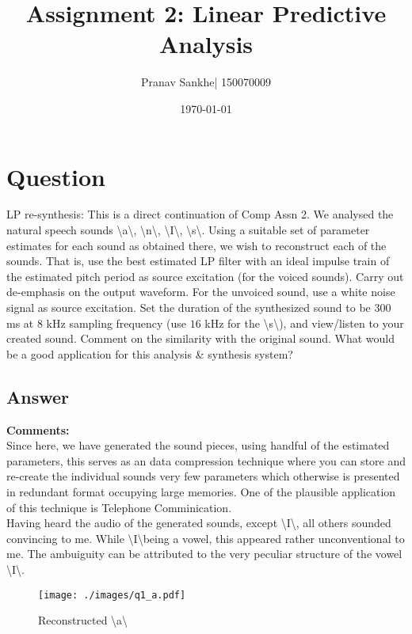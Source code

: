 \documentclass[a4paper]{article}
\title{Assignment 2: Linear Predictive Analysis}
\author{Pranav Sankhe| 150070009}
\date{\today}
\begin{document}
\maketitle

\section{Question}
LP re-synthesis: This is a direct continuation of Comp Assn 2. We analysed the natural speech sounds \textbackslash a\textbackslash, \textbackslash n\textbackslash, \textbackslash I\textbackslash, \textbackslash s\textbackslash. Using a suitable set of parameter estimates for each sound as obtained there, we wish to reconstruct each of the sounds. That is, use the best estimated LP filter with an ideal impulse train of the estimated pitch period as source excitation (for the voiced sounds). Carry out de-emphasis on the output waveform. For the unvoiced sound, use a white noise signal as source excitation. Set the duration of the synthesized sound to be $300$ ms at $8$ kHz sampling frequency (use $16$ kHz for the \textbackslash s\textbackslash), and view/listen to your created sound. Comment on the similarity with the original sound. What would be a good application for this analysis \& synthesis system?

\subsection{Answer}
\textbf{Comments:} \\ 
Since here, we have generated the sound pieces, using handful of the estimated parameters, this serves as an data compression technique where you can store and re-create the individual sounds very few parameters which otherwise is presented in redundant format occupying large memories. One of the plausible application of this technique is Telephone Comminication. \\
Having heard the audio of the generated sounds, except \textbackslash I\textbackslash, all others sounded convincing to me. While \textbackslash I\textbackslash being a vowel, this appeared rather unconventional to me. The ambuiguity can be attributed to the very peculiar structure of the vowel \textbackslash I\textbackslash.  


\begin{figure}[h!]
    \texttt{[image: ./images/q1\_a.pdf]}
    \caption{Reconstructed \textbackslash a\textbackslash}
    \label{fig:1}
\end{figure}
\end{document}
